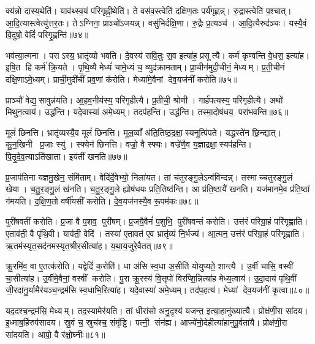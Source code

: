 क्य॑न्नो दास्य॒थेति॑। याव॑थ्स्व॒यं प॑रिगृह्णी॒थेति॑। ते वस॑व॒स्त्वेति॑ दक्षिण॒तः पर्य॑गृह्णन्न्। रु॒द्रास्त्वेति॑ प॒श्चात्। आ॒दि॒त्यास्त्वेत्यु॑त्तर॒तः। तेऽग्निना॒ प्राञ्चो॑ऽजयन्न्। वसु॑भिर्दक्षि॒णा। रु॒द्रैः प्र॒त्यञ्च॑। आ॒दि॒त्यैरुद॑ञ्चः। यस्यै॒वं वि॒दुषो॒ वेदिं॑ परिगृ॒ह्णन्ति॑॥७४॥

भव॑त्या॒त्मना। पराऽस्य॒ भ्रातृ॑व्यो भवति। दे॒वस्य॑ सवि॒तुः स॒व इत्या॑ह॒ प्रसूत्यै। कर्म॑ कृण्वन्ति वे॒धस॒ इत्या॑ह। इ॒षि॒त हि कर्म॑ क्रि॒यते। पृ॒थि॒व्यै मेध्यं॑ चामे॒ध्यं च॒ व्युद॑क्रामताम्। प्रा॒चीन॑मुदी॒चीनं॒ मेध्यम्। प्र॒ती॒चीनं॑ दक्षि॒णाऽमे॒ध्यम्। प्राची॒मुदी॑चीं प्रव॒णां क॑रोति। मेध्या॑मे॒वैनां देव॒यज॑नीं करोति॥७५॥

प्राञ्चौ॑ वेद्य॒सावुन्न॑यति। आ॒ह॒व॒नीय॑स्य॒ परि॑गृहीत्यै। प्र॒तीची॒ श्रोणी। गार्ह॑पत्यस्य॒ परि॑गृहीत्यै। अथो॑ मिथुन॒त्वाय॑। उद्ध॑न्ति। यदे॒वास्या॑ अमे॒ध्यम्। तदप॑हन्ति। उद्ध॑न्ति। तस्मा॒दोष॑धय॒ परा॑भवन्ति॥७६॥

मूलं॑ छिनत्ति। भ्रातृ॑व्यस्यै॒व मूलं॑ छिनत्ति। मूल॒व्वाँ अ॑ति॒तिष्ठ॒द्रक्षा॒स्यनूत्पि॑पते। यद्धस्ते॑न छि॒न्द्यात्। कु॒न॒खिनी प्र॒जाः स्यु॑। स्फ्येन॑ छिनत्ति। वज्रो॒ वै स्फ्यः। वज्रे॑णै॒व य॒ज्ञाद्रक्षा॒स्यप॑हन्ति। पि॒तृ॒दे॒व॒त्याऽति॑खाता। इय॑तीं खनति॥७७॥

प्र॒जाप॑तिना यज्ञमु॒खेन॒ संमि॑ताम्। वेदि॑र्दे॒वेभ्यो॒ निला॑यत। तां च॑तुरङ्गु॒लेऽन्व॑विन्दन्न्। तस्माच्चतुरङ्गु॒लं खेया। च॒तु॒र॒ङ्गु॒लं ख॑नति। च॒तु॒र॒ङ्गु॒ले ह्योष॑धयः प्रति॒तिष्ठ॑न्ति। आ प्र॑ति॒ष्ठायै॑ खनति। यज॑मानमे॒व प्र॑ति॒ष्ठां ग॑मयति। द॒क्षि॒ण॒तो वर्\mbox{}षी॑यसीं करोति। दे॒व॒यज॑नस्यै॒व रू॒पम॑कः॥७८॥

पुरी॑षवतीं करोति। प्र॒जा वै प॒शव॒ पुरी॑षम्। प्र॒जयै॒वैनं॑ प॒शुभि॒ पुरी॑षवन्तं करोति। उत्त॑रं परिग्रा॒हं परि॑गृह्णाति। ए॒ताव॑ती॒ वै पृ॑थि॒वी। याव॑ती॒ वेदि॑। तस्या॑ ए॒तावत॑ ए॒व भ्रातृ॑व्यं नि॒र्भज्य॑। आ॒त्मन॒ उत्त॑रं परिग्रा॒हं परि॑गृह्णाति। ऋ॒तम॑स्यृत॒सद॑नमस्यृत॒श्रीर॒सीत्या॑ह। य॒था॒य॒जुरे॒वैतत्॥७९॥

क्रू॒रमि॑व॒ वा ए॒तत्क॑रोति। यद्वेदिं॑ क॒रोति॑। धा अ॑सि स्व॒धा अ॒सीति॑ योयुप्यते॒ शान्त्यै। उ॒र्वी चासि॒ वस्वी॑ चा॒सीत्या॑ह। उ॒र्वीमे॒वैनां॒ वस्वीं करोति। पु॒रा क्रू॒रस्य॑ वि॒सृपो॑ विरप्शि॒न्नित्या॑ह मेध्य॒त्वाय॑। उ॒दा॒दाय॑ पृथि॒वीं जी॒रदा॑नु॒र्यामैर॑यञ्च॒न्द्रम॑सि स्व॒धाभि॒रित्या॑ह। यदे॒वास्या॑ अमे॒ध्यम्। तद॑प॒हत्य॑। मेध्यां देव॒यज॑नीं कृ॒त्वा॥८०॥

यद॒दश्च॒न्द्रम॑सि॒ मेध्यम्। तद॒स्यामेर॑यति। तां धीरा॑सो अनु॒दृश्य॑ यजन्त॒ इत्या॒हानु॑ख्यात्यै। प्रोक्ष॑णी॒रा सा॑दय। इ॒ध्माब॒र्\mbox{}हिरुप॑सादय। स्रु॒वं च॒ स्रुच॑श्च॒ संमृ॑ड्ढि। पत्नी॒ संन॑ह्य। आज्ये॑नो॒देहीत्या॑हानुपू॒र्वता॑यै। प्रोक्ष॑णी॒रा सा॑दयति। आपो॒ वै र॑क्षो॒घ्नीः॥८१॥

